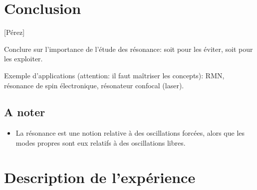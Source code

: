 \documentclass[11pt]{report}
\numberwithin{figure}{section}
\numberwithin{equation}{section}
\numberwithin{table}{section}
\newcommand{\1}{\boldsymbol{1}}
\begin{document}
\section*{Conclusion}

[Pérez]

Conclure sur l'importance de l'étude des résonance: soit pour les éviter, soit pour les exploiter.

Exemple d'applications (attention: il faut maîtriser les concepts): RMN, résonance de spin électronique, résonateur confocal (laser).


\subsection*{A noter}
\begin{itemize}
\item La résonance est une notion relative à des oscillations forcées,
alors que les modes propres sont eux relatifs à des oscillations libres.
\end{itemize}

\section*{Description de l'expérience}
\end{document}
